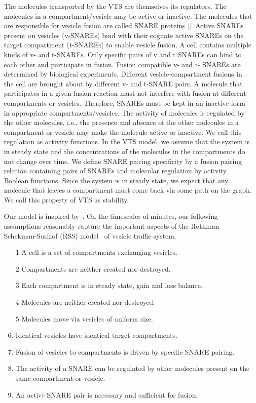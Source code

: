 The molecules transported by the VTS are themselves its regulators. The molecules in a
compartment/vesicle may be active or inactive. The molecules that are responsible for vesicle fusion
are called SNARE proteins []. Active SNAREs present on vesicles (v-SNAREs) bind with their
cognate active SNAREs on the target compartment (t-SNAREs) to enable vesicle fusion. A cell
contains multiple kinds of v- and t-SNAREs. Only specific pairs of v and t SNAREs can bind to
each other and participate in fusion. Fusion compatible v- and t- SNAREs are determined by
biological experiments. Different vesicle-compartment fusions in the cell are brought about by
different v- and t-SNARE pairs. A molecule that participates in a given fusion reaction must not
interfere with fusion at different compartments or vesicles. Therefore, SNAREs must be kept in an
inactive form in appropriate compartments/vesicles. The activity of molecules is regulated by the
other molecules, i.e., the presence and absence of the other molecules in a compartment or vesicle
may make the molecule active or inactive. We call this regulation as activity functions.
In the VTS model, we assume that the system is in steady state and the concentrations of the
molecules in the compartments do not change over time. We define SNARE pairing specificity by a
fusion pairing relation containing pairs of SNAREs and molecular regulation by activity Boolean
functions. Since the system is in steady state, we expect that any molecule that leaves a
compartment must come back via some path on the graph. We call this property of VTS as stability.

Our model is inspired by~\cite{shukla2017discovering}. On the timescales of minutes, our following assumptions reasonably capture the important aspects of the Rothman-Schekman-Sudhof (RSS) model~\cite{rothman2002machinery} of vesicle traffic system.
\begin{enumerate}
\item[1] A cell is a set of compartments exchanging vesicles.
\item[2] Compartments are neither created nor destroyed.
\item[3] Each compartment is in steady state, gain and loss balance.
\item[4] Molecules are neither created nor destroyed.
\item[5] Molecules move via vesicles of uniform size.
\item Identical vesicles have identical target compartments.
\item Fusion of vesicles to compartments is driven by specific SNARE pairing.
\item The activity of a SNARE can be regulated by other molecules present on the same compartment
or vesicle.
\item An active SNARE pair is necessary and sufficient for fusion. 
\end{enumerate}
 
